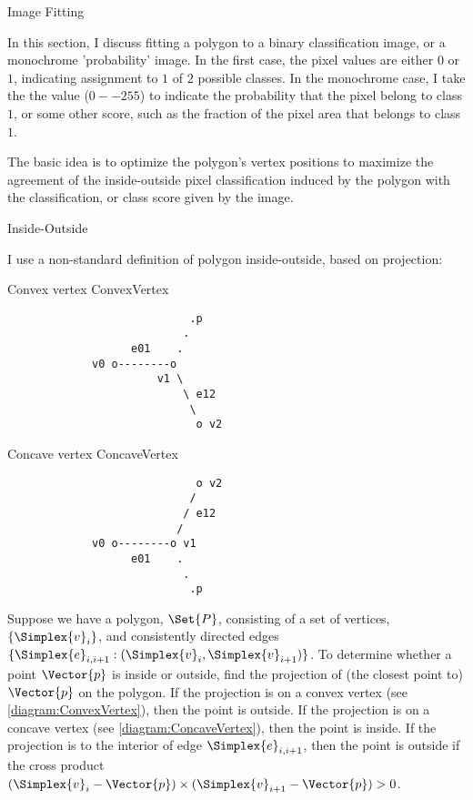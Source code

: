 \begin{plSection}{Image Fitting}
\label{sec:image-fitting}

In this section, I discuss fitting a polygon to a binary classification
image, or a monochrome 'probability' image.
In the first case, the pixel values are either $0$ or $1$,
indicating assignment to $1$ of $2$ possible classes.
In the monochrome case, I take the the value ($0--255$) to indicate
the probability that the pixel belong to class $1$,
or some other score, such as the fraction of the pixel area that belongs
to class $1$.

The basic idea is to optimize the polygon's vertex positions
to maximize the agreement of the inside-outside pixel classification
induced by the polygon with the classification, or class score
given by the image.

\begin{plSection}{Inside-Outside}
\label{sec:inside-outside}

I use a non-standard definition of polygon inside-outside,
based on projection:

\begin{plDiagram}
{Convex vertex}
{ConvexVertex}
\centering
\begin{verbatim}
                            .p
                           .
                   e01    .
             v0 o--------o
                       v1 \
                           \ e12
                            \
                             o v2
\end{verbatim}
\end{plDiagram}

\begin{plDiagram}
{Concave vertex}
{ConcaveVertex}
\centering
\begin{verbatim}
                             o v2
                            /
                           / e12
                          /
             v0 o--------o v1
                   e01    .
                           .
                            .p
\end{verbatim}
\end{plDiagram}

Suppose we have a polygon, $\Set{P}$, consisting of a set of vertices,
$\{\Simplex{v}_i\}$, and consistently directed edges $\{\Simplex{e}_{i,i+1}:(\Simplex{v}_i,\Simplex{v}_{i+1})\}$.
To determine whether a point $\Vector{p}$ is inside or outside,
find the projection of (the closest point to) $\Vector{p}$ on the polygon.
If the projection is on a convex vertex (see \ref{diagram:ConvexVertex}),
then the point is outside.
If the projection is on a concave vertex (see \ref{diagram:ConcaveVertex}),
then the point is inside.
If the projection is to the interior of edge $\Simplex{e}_{i,i+1}$,
then the point is outside if the cross product
$(\Simplex{v}_i-\Vector{p}) \times (\Simplex{v}_{i+1}-\Vector{p}) > 0$.


\end{plSection}
\end{plSection}
